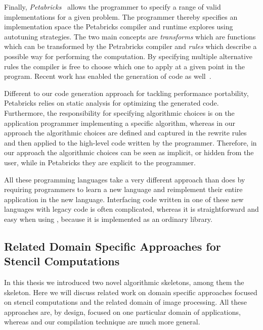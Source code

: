 \bigskip

Finally, \emph{Petabricks}~\cite{AnselCWOZEA09} allows the programmer to specify a range of valid implementations for a given problem.
The programmer thereby specifies an implementation space the Petabricks compiler and runtime explores using autotuning strategies.
The two main concepts are \emph{transforms} which are functions which can be transformed by the Petrabricks compiler and \emph{rules} which describe a possible way for performing the computation.
By specifying multiple alternative rules the compiler is free to choose which one to apply at a given point in the program.
Recent work has enabled the generation of \GPU code as well~\cite{PhothilimthanaARA13}.

Different to our code generation approach for tackling performance portability, Petabricks relies on static analysis for optimizing the generated code.
Furthermore, the responsibility for specifying algorithmic choices is on the application programmer implementing a specific algorithm, whereas in our approach the algorithmic choices are defined and captured in the rewrite rules and then applied to the high-level code written by the programmer.
Therefore, in our approach the algorithmic choices can be seen as implicit, or hidden from the user, while in Petabricks they are explicit to the programmer.

\bigskip
All these programming languages take a very different approach than \SkelCL does by requiring programmers to learn a new language and reimplement their entire application in the new language.
Interfacing code written in one of these new languages with legacy code is often complicated, whereas it is straightforward and easy when using \SkelCL, because it is implemented as an ordinary \Cpp library.

\subsection[Related Domain Specific Approaches for\\ Stencil Computations]{Related Domain Specific Approaches for Stencil Computations}
In this thesis we introduced two novel algorithmic skeletons, among them the \stencil skeleton.
Here we will discuss related work on domain specific approaches focused on stencil computations and the related domain of image processing.
All these approaches are, by design, focused on one particular domain of applications, whereas \SkelCL and our compilation technique are much more general.

